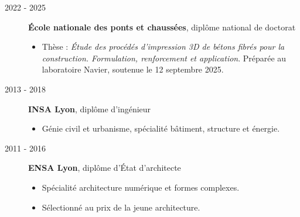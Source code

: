 \documentclass[11pt,a4paper]{article}
\begin{document}
\begin{description}
  \item[2022 - 2025] \textbf{École nationale des ponts et chaussées}, diplôme national de doctorat
  \begin{itemize}
    \item Thèse : \emph{Étude des procédés d'impression 3D de bétons fibrés pour la construction. Formulation, renforcement et application}. Préparée au laboratoire Navier, soutenue le 12 septembre 2025.
  \end{itemize}

  \item[2013 - 2018] \textbf{INSA Lyon}, diplôme d'ingénieur
  \begin{itemize}
    \item Génie civil et urbanisme, spécialité bâtiment, structure et énergie.
  \end{itemize}

  \item[2011 - 2016] \textbf{ENSA Lyon}, diplôme d'État d'architecte
  \begin{itemize}
    \item Spécialité architecture numérique et formes complexes.
    \item Sélectionné au prix de la jeune architecture.
  \end{itemize}
\end{description}

\end{document}
